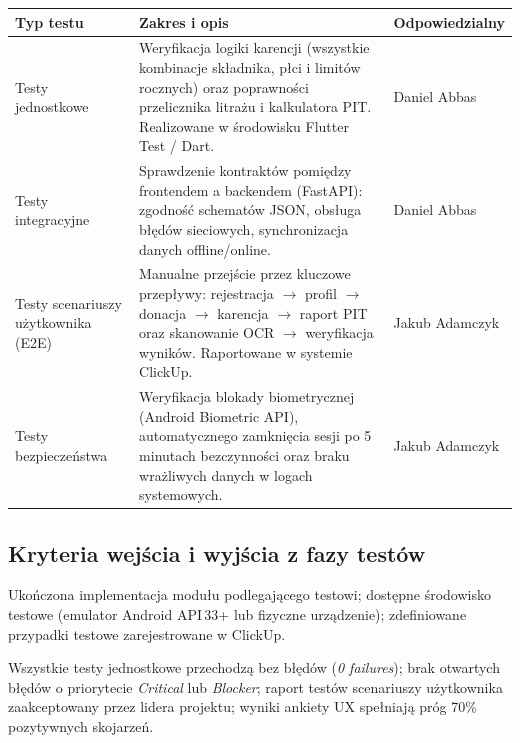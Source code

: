 \documentclass[11pt, a4paper]{article}
\newcommand{\term}[1]{\textbf{#1}}
\begin{document}
\begin{center}
\begin{tabularx}{\linewidth}{L{3.2cm} X L{2.8cm}}
  \toprule
  \textbf{Typ testu} & \textbf{Zakres i opis} & \textbf{Odpowiedzialny} \\
  \midrule
  Testy jednostkowe
    & Weryfikacja logiki karencji (wszystkie kombinacje składnika, płci i limitów rocznych)
      oraz poprawności przelicznika litrażu i kalkulatora PIT. Realizowane w środowisku
      Flutter Test / Dart.
    & Daniel Abbas \\
  \addlinespace
  Testy integracyjne
    & Sprawdzenie kontraktów pomiędzy frontendem a backendem (FastAPI): zgodność schematów
      JSON, obsługa błędów sieciowych, synchronizacja danych offline/online.
    & Daniel Abbas\\
  \addlinespace
  Testy scenariuszy użytkownika (E2E)
    & Manualne przejście przez kluczowe przepływy: rejestracja $\to$ profil $\to$ donacja
      $\to$ karencja $\to$ raport PIT oraz skanowanie OCR $\to$ weryfikacja wyników.
      Raportowane w systemie ClickUp.
    & Jakub Adamczyk\\
  
  \addlinespace
  Testy bezpieczeństwa
    & Weryfikacja blokady biometrycznej (Android Biometric API), automatycznego zamknięcia
      sesji po 5 minutach bezczynności oraz braku wrażliwych danych w logach systemowych.
    & Jakub Adamczyk \\
  \bottomrule
\end{tabularx}
\end{center}

\subsection{Kryteria wejścia i wyjścia z fazy testów}

\begin{description}[leftmargin=0pt]
  \item[\term{Kryteria wejścia:}]
  Ukończona implementacja modułu podlegającego testowi; dostępne środowisko testowe
  (emulator Android API\,33+ lub fizyczne urządzenie); zdefiniowane przypadki testowe
  zarejestrowane w ClickUp.

  \item[\term{Kryteria wyjścia (Definition of Done):}]
  Wszystkie testy jednostkowe przechodzą bez błędów (\textit{0 failures}); brak
  otwartych błędów o priorytecie \textit{Critical} lub \textit{Blocker}; raport
  testów scenariuszy użytkownika zaakceptowany przez lidera projektu; wyniki ankiety UX
  spełniają próg 70\% pozytywnych skojarzeń.
\end{description}
\end{document}

